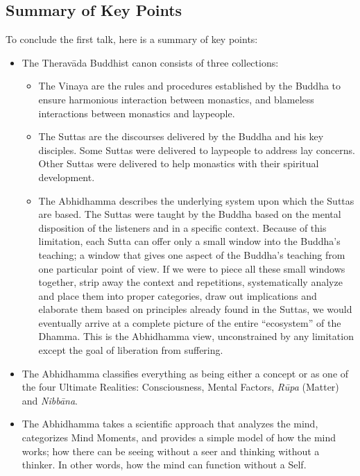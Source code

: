\subsection*{Summary of Key Points}

To conclude the first talk, here is a summary of key points:

\begin{itemize}

\item The Theravāda Buddhist canon consists of three collections:

\begin{itemize}

\item The Vinaya are the rules and procedures established by the Buddha to ensure harmonious interaction between monastics, and blameless interactions between monastics and laypeople.

\item The Suttas are the discourses delivered by the Buddha and his key disciples. Some Suttas were delivered to laypeople to address lay concerns. Other Suttas were delivered to help monastics with their spiritual development.

\pagebreak

\item The Abhidhamma describes the underlying system upon which the Suttas are based. The Suttas were taught by the Buddha based on the mental disposition of the listeners and in a specific context. Because of this limitation, each Sutta can offer only a small window into the Buddha’s teaching; a window that gives one aspect of the Buddha’s teaching from one particular point of view. If we were to piece all these small windows together, strip away the context and repetitions, systematically analyze and place them into proper categories, draw out implications and elaborate them based on principles already found in the Suttas, we would eventually arrive at a complete picture of the entire “ecosystem” of the Dhamma. This is the Abhidhamma view, unconstrained by any limitation except the goal of liberation from suffering.

\end{itemize}

\item The Abhidhamma classifies everything as being either a concept or as one of the four Ultimate Realities: Consciousness, Mental Factors, \textit{Rūpa} (Matter) and \textit{Nibbāna}.

\item The Abhidhamma takes a scientific approach that analyzes the mind, categorizes Mind Moments, and provides a simple model of how the mind works; how there can be seeing without a seer and thinking without a thinker. In other words, how the mind can function without a Self.


\end{itemize}
